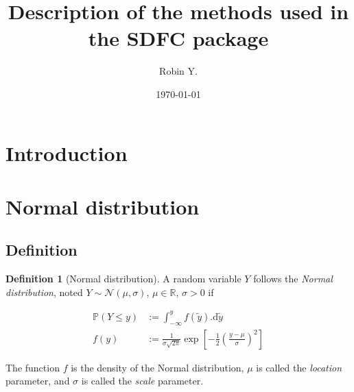 \documentclass[12pt,a4paper]{article}
\title{Description of the methods used in the SDFC package}
\author{Robin Y.}
\date{\today}
\theoremstyle{plain}
\theoremstyle{definition}
\newtheorem{definition}{Definition}[section]
\theoremstyle{remark}
\newcommand{\PP}{\mathbb{P}}
\newcommand{\RR}{\mathbb{R}}
\begin{document}

\maketitle



\begin{abstract}
\end{abstract}






\tableofcontents


\section*{Introduction} %


\section{Normal distribution} %

\subsection{Definition} %

\begin{definition}[Normal distribution] A random variable $Y$ follows
the \emph{Normal distribution}, noted $Y\sim\mathcal{N}(\mu,\sigma)$,
$\mu\in\RR$, $\sigma>0$ if

\[
\begin{aligned}
\PP(Y\leq y) &:= \int_{-\infty}^y f(\tilde{y}).\mathrm{d}\tilde{y}\\
f(y) &:= \frac{1}{\sigma\sqrt{2\pi}} \exp\left[-\frac{1}{2}\left(\frac{y-\mu}{\sigma}\right)^2 \right]
\end{aligned}
\]

\noindent The function $f$ is the density of the Normal distribution, $\mu$ is
called the \emph{location} parameter, and $\sigma$ is called the \emph{scale}
parameter.

\end{definition}

\end{document}
